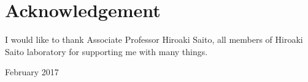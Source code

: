 \chapter*{Acknowledgement}
I would like to thank Associate Professor Hiroaki Saito, all members of Hiroaki Saito laboratory for supporting me with many things.
\begin{flushright}
 February  2017
\end{flushright}

